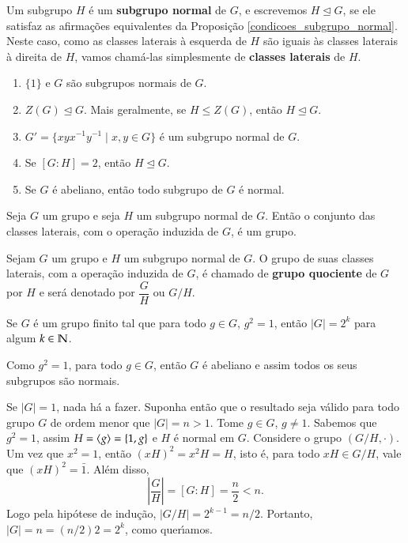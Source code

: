 \begin{definicao}
	Um subgrupo $H$ \'e um \textbf{subgrupo normal} de $G$, e escrevemos $H \unlhd G$, se ele satisfaz as afirma\c{c}\~oes equivalentes da Proposi\c{c}\~ao \ref{condicoes_subgrupo_normal}. Neste caso, como as classes laterais \`a esquerda de $H$ s\~ao iguais \`as classes laterais \`a direita de $H$, vamos cham\'a-las simplesmente de \textbf{classes laterais} de $H$.
\end{definicao}

\begin{exemplos}
	\begin{enumerate}[label=({\arabic*})]
		\item $\{1\}$ e $G$ s\~ao subgrupos normais de $G$.
		\item $Z(G) \unlhd G$. Mais geralmente, se $H \le Z(G)$, ent\~ao $H \unlhd G$.
		\item $G' = \{xyx^{-1}y^{-1} \mid x, y \in G\}$ \'e um subgrupo normal de $G$.
		\item Se $[G:H] = 2$, ent\~ao $H \unlhd G$.
		\item Se $G$ \'e abeliano, ent\~ao todo subgrupo de $G$ \'e normal.
	\end{enumerate}
\end{exemplos}

\begin{teorema}
	Seja $G$ um grupo e seja $H$ um subgrupo normal de $G$. Ent\~ao o conjunto das classes laterais, com o opera\c{c}\~ao induzida de $G$, \'e um grupo.
\end{teorema}

\begin{definicao}
	Sejam $G$ um grupo e $H$ um subgrupo normal de $G$. O grupo de suas classes laterais, com a opera\c{c}\~ao induzida de $G$, \'e chamado de \textbf{grupo quociente} de $G$ por $H$ e ser\'a denotado por $\dfrac{G}{H}$ ou $G/H$.
\end{definicao}

\begin{proposicao}\label{grupo_com_ordem_potencia_de_dois}
	Se $G$ \'e um grupo finito tal que para todo $g \in G$, $g^2 = 1$, ent\~ao $|G| = 2^k$ para algum $k \in \mathbb{N}$.
\end{proposicao}
\begin{prova}
	Como $g^2 = 1$, para todo $g \in G$, ent\~ao $G$ \'e abeliano e assim todos os seus subgrupos s\~ao normais.

	Se $|G| = 1$, nada h\'a a fazer. Suponha ent\~ao que o resultado seja v\'alido para todo grupo $G$ de ordem menor que $|G| = n > 1$. Tome $g \in G$, $g \ne 1$. Sabemos que $g^2 = 1$, assim $H = \langle{g}\rangle = \{1,g\}$ e $H$ \'e normal em $G$. Considere o grupo $(G/H,\cdot)$. Um vez que $x^2 = 1$, ent\~ao $(xH)^2 = x^2H = H$, isto \'e, para todo $xH \in G/H$, vale que $(xH)^2 = \bar{1}$. Al\'em disso,
	\[
		\left|\dfrac{G}{H}\right| = [G:H] = \dfrac{n}{2} < n.
	\]
	Logo pela hip\'otese de indu\c{c}\~ao, $|G/H| = 2^{k - 1} = n/2$. Portanto, $|G| = n = (n/2)2 = 2^k$, como quer{\'\i}amos.
\end{prova}

